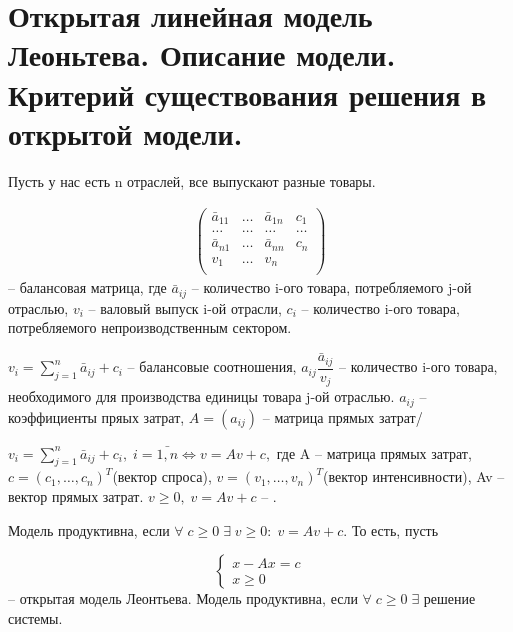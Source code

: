 \chapter{Открытая линейная модель Леоньтева. Описание модели. Критерий существования решения в открытой модели.}\label{cha:8}

Пусть у нас есть n отраслей, все выпускают разные товары.

\begin{definition}
	\begin{gather*}
		\begin{pmatrix}
		  \bar{a}_{11} & \ldots & \bar{a}_{1n} & c_1\\
		  \ldots & \ldots & \ldots & \ldots\\
		  \bar{a}_{n1} & \ldots & \bar{a}_{nn} & c_n\\
		  v_1 & \ldots & v_n &  \\
		\end{pmatrix}
	\end{gather*} -- балансовая матрица, где $\bar{a}_{ij}$ -- количество i-ого товара, потребляемого j-ой отраслью, $v_i$ -- валовый выпуск i-ой отрасли, $c_i$ -- количество i-ого товара, потребляемого непроизводственным сектором.

	$v_i = \sum\limits_{j = 1}^n \bar{a}_{ij} + c_i$ -- балансовые соотношения, $a_{ij} \dfrac{\bar{a}_{ij}}{v_j}$ -- количество i-ого товара, необходимого для производства единицы товара j-ой отраслью. $a_{ij}$ -- коэффициенты пряых затрат, $A = (a_{ij})$ -- матрица прямых затрат/
\end{definition}

\begin{definition}
	$v_i = \sum\limits_{j = 1}^n \bar{a}_{ij} + c_i, \; i = \bar{1,n} \Leftrightarrow v = Av + c, $ где A -- матрица прямых затрат, $c = (c_1, \ldots, c_n)^T$(вектор спроса), $v = (v_1, \ldots, v_n)^T$(вектор интенсивности), Av -- вектор прямых затрат. $v \geq 0, \; v = Av + c$ -- .
\end{definition}

\begin{definition}
	Модель продуктивна, если $\forall \; c \geq 0 \; \exists \; v \geq 0: \; v = Av + c.$ То есть, пусть 

	\begin{equation*}
		\begin{cases}
			x - Ax = c \\
			x \geq 0
		\end{cases} 
	\end{equation*}--
	открытая модель Леонтьева. Модель продуктивна, если $\forall \; c \geq 0 \; \exists $ решение системы.
\end{definition}

